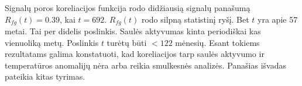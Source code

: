 Signalų poros koreliacijos funkcija rodo didžiausią signalų panašumą \( R_{fg}(t) = 0.39 \), kai \( t = 692 \).
\( R_{fg}(t)\) rodo silpną statistinį ryšį. Bet \(t\) yra apie 57 metai.
Tai per didelis poslinkis.
Saulės aktyvumas kinta periodiškai kas vienuoliką metų.
Poslinkis \(t\) turėtų būti \(< 122 \) mėnesių.
Esant tokiems rezultatams galima konstatuoti, kad koreliacijos tarp saulės aktyvumo ir temperatūros anomalijų nėra arba reikia smulkesnės analizės.
Panašias išvadas pateikia kitas tyrimas\cite{temp_study}.
